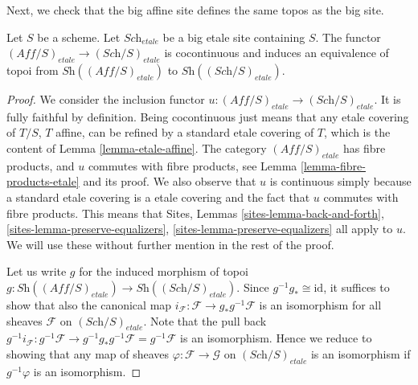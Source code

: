 \noindent
Next, we check that the big affine site defines the same
topos as the big site.

\begin{lemma}
\label{lemma-affine-big-site-etale}
Let $S$ be a scheme. Let $\textit{Sch}_{etale}$ be a big etale
site containing $S$.
The functor $(\textit{Aff}/S)_{etale} \to (\textit{Sch}/S)_{etale}$
is cocontinuous and induces an equivalence of topoi from
$\textit{Sh}((\textit{Aff}/S)_{etale})$ to
$\textit{Sh}((\textit{Sch}/S)_{etale})$.
\end{lemma}

\begin{proof}
We consider the inclusion functor
$u : (\textit{Aff}/S)_{etale} \to (\textit{Sch}/S)_{etale}$.
It is fully faithful by definition. Being cocontinuous
just means that any etale covering of $T/S$, $T$ affine,
can be refined by a standard etale covering of $T$, which
is the content of Lemma \ref{lemma-etale-affine}.
The category $(\textit{Aff}/S)_{etale}$ has fibre products, and $u$ commutes
with fibre products, see Lemma \ref{lemma-fibre-products-etale}
and its proof.
We also observe that $u$ is continuous
simply because a standard etale covering is a etale covering
and the fact that $u$ commutes with fibre products.
This means that
Sites, Lemmas \ref{sites-lemma-back-and-forth},
\ref{sites-lemma-preserve-equalizers},
\ref{sites-lemma-preserve-equalizers} all apply to $u$.
We will use these without further mention in the rest of the proof.

\medskip\noindent
Let us write $g$ for the induced morphism of topoi
$g : \textit{Sh}((\textit{Aff}/S)_{etale}) \to
\textit{Sh}((\textit{Sch}/S)_{etale})$.
Since $g^{-1}g_* \cong \text{id}$, it suffices to show that
also the canonical map
$i_{\mathcal{F}} : \mathcal{F} \to g_* g^{-1} \mathcal{F}$
is an isomorphism for all sheaves $\mathcal{F}$ on
$(\textit{Sch}/S)_{etale}$. Note that the pull back
$g^{-1}i_{\mathcal{F}} : g^{-1} \mathcal{F} \to
g^{-1} g_* g^{-1} \mathcal{F} = g^{-1} \mathcal{F}$
is an isomorphism. Hence we reduce to showing that any
map of sheaves $\varphi : \mathcal{F} \to \mathcal{G}$ on
$(\textit{Sch}/S)_{etale}$ is an isomorphism if $g^{-1}\varphi$
is an isomorphism.


\end{proof}
